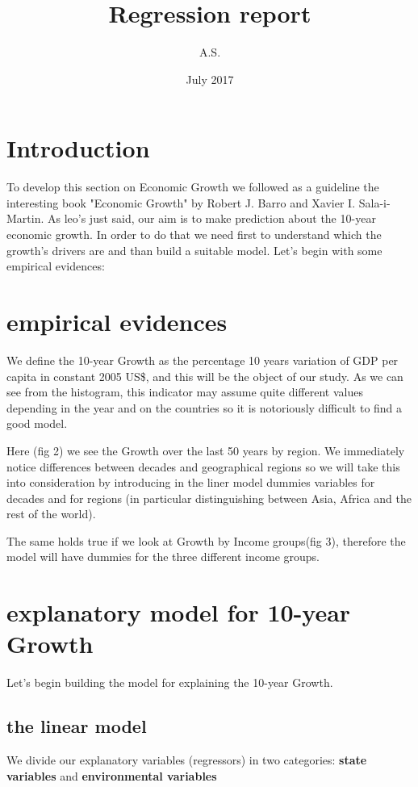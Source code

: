 \documentclass[11pt,a4paper]{article}
\title{Regression report}
\author{A.S.}
\date{July 2017}
\begin{document}
\maketitle



\newpage
\tableofcontents
\newpage
\section{Introduction}
To develop this section on Economic Growth we followed as a guideline
the interesting book "Economic Growth" by Robert J. Barro and Xavier I. Sala-i-Martin.
As leo's just said, our aim is to make prediction about the 10-year economic growth. In order to do that we need first to understand which the growth's drivers are and than build a suitable model. Let's begin with some empirical evidences:
\section{empirical evidences}

We define the 10-year Growth as the percentage 10 years variation of GDP per capita in constant 2005 US\$, and this will be the object of our study. As we can see from the histogram, this indicator may assume quite different values depending in the year and on the countries so it is notoriously difficult to find a good model.

Here (fig 2) we see the Growth over the last 50 years by region. We immediately notice differences between decades and geographical regions so we will take this into consideration by introducing in the liner model dummies variables for decades and for regions (in particular distinguishing between Asia, Africa and the rest of the world).

The same holds true if we look at Growth by Income groups(fig 3), therefore the model will have dummies for the three different income groups.



\section{explanatory model for 10-year Growth}
Let's begin building the model for explaining the 10-year Growth.
\subsection{the linear model}
We divide our explanatory variables (regressors) in two categories: \textbf{state variables} and \textbf{environmental variables}
\end{document}
